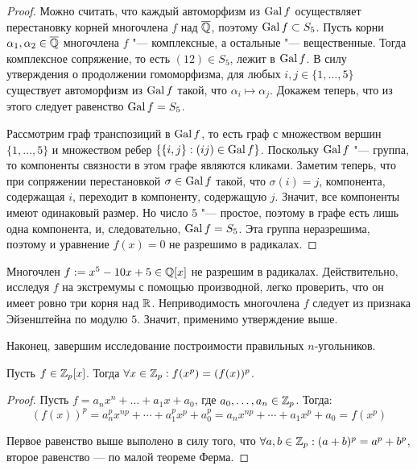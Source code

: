 \begin{proof}
	Можно считать, что каждый автоморфизм из $\operatorname{Gal}{f}$ осуществляет перестановку корней многочлена $f$ над $\overline{\mathbb{Q}}$, поэтому $\operatorname{Gal}{f} \subset S_5$. Пусть корни $\alpha_1, \alpha_2 \in \overline{\mathbb{Q}}$ многочлена $f$ "--- комплексные, а остальные "--- вещественные. Тогда комплексное сопряжение, то есть $(12) \in S_5$, лежит в $\operatorname{Gal}{f}$. В силу утверждения о продолжении гомоморфизма, для любых $i, j \in \{1, \dotsc, 5\}$ существует автоморфизм из $\operatorname{Gal}{f}$ такой, что $\alpha_i \mapsto \alpha_j$. Докажем теперь, что из этого следует равенство $\operatorname{Gal}{f} = S_5$.
	
	Рассмотрим граф транспозиций в $\operatorname{Gal}{f}$, то есть граф с множеством вершин $\{1, \dotsc, 5\}$ и множеством ребер $\{\{i, j\} : (ij) \in \operatorname{Gal}{f}\}$. Поскольку $\operatorname{Gal}{f}$ "--- группа, то компоненты связности в этом графе являются кликами. Заметим теперь, что при сопряжении перестановкой $\sigma \in \operatorname{Gal}{f}$ такой, что $\sigma(i) = j$, компонента, содержащая $i$, переходит в компоненту, содержащую $j$. Значит, все компоненты имеют одинаковый размер. Но число $5$ "--- простое, поэтому в графе есть лишь одна компонента, и, следовательно, $\operatorname{Gal}{f} = S_5$. Эта группа неразрешима, поэтому и уравнение $f(x) = 0$ не разрешимо в радикалах.
\end{proof}

\begin{example}
	Многочлен $f := x^5 - 10x + 5 \in \mathbb{Q}[x]$ не разрешим в радикалах. Действительно, исследуя $f$ на экстремумы с помощью производной, легко проверить, что он имеет ровно три корня над $\mathbb{R}$. Неприводимость многочлена $f$ следует из признака Эйзенштейна по модулю $5$. Значит, применимо утверждение выше.
\end{example}

Наконец, завершим исследование построимости правильных $n$-угольников.

\begin{proposition}
	Пусть $f \in \mathbb{Z}_p[x]$. Тогда $\forall x \in \mathbb{Z}_p: f(x^p) = (f(x))^p$.
\end{proposition}

\begin{proof}
	Пусть $f = a_nx^n + \dotsc + a_1x + a_0$, где $a_0, \dotsc, a_n \in \mathbb{Z}_p$. Тогда:
	\[(f(x))^p = a_n^px^{np} + \dotsb + a_1^px^p + a_0^p = a_nx^{np} + \dotsb + a_1x^p + a_0 = f(x^p)\]
	
	Первое равенство выше выполено в силу того, что $\forall a, b \in \mathbb{Z}_p: (a + b)^p = a^p + b^p$, второе равенство --- по малой теореме Ферма.
\end{proof}

